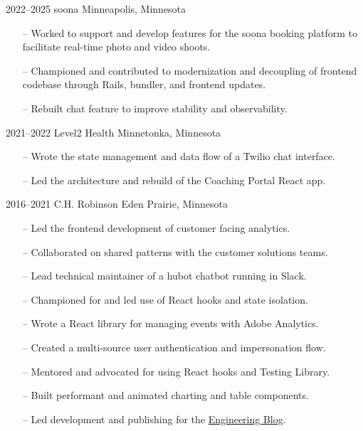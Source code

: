 \documentclass[]{cv-style} %
\begin{document}
\begin{entrylist}


\entry
{2022--2025}
{soona}
{Minneapolis, Minnesota}
{
\begin{itemize}
    \item[--] Worked to support and develop features for the soona booking platform to facilitate real-time photo and video shoots.
    \item[--] Championed and contributed to modernization and decoupling of frontend codebase through Rails, bundler, and frontend updates.
    \item[--] Rebuilt chat feature to improve stability and observability.
\end{itemize}}

\entry
{2021--2022}
{Level2 Health}
{Minnetonka, Minnesota}
{
\begin{itemize}
    \item[--] Wrote the state management and data flow of a Twilio chat interface.
    \item[--] Led the architecture and rebuild of the Coaching Portal React app.
\end{itemize}}

\entry
{2016--2021}
{C.H. Robinson}
{Eden Prairie, Minnesota}
{

\begin{itemize}
    \item[--] Led the frontend development of customer facing analytics.
    \item[--] Collaborated on shared patterns with the customer solutions teams.
    \item[--] Lead technical maintainer of a hubot chatbot running in Slack.
    \item[--] Championed for and led use of React hooks and state isolation.
\end{itemize}

\begin{itemize}
    \item[--] Wrote a React library for managing events with Adobe Analytics.
    \item[--] Created a multi-source user authentication and impersonation flow.
    \item[--] Mentored and advocated for using React hooks and Testing Library.
    \item[--] Built performant and animated charting and table components.
    \item[--] Led development and publishing for the \href{https://engineering.chrobinson.com}{Engineering Blog}.
\end{itemize}

}
\end{entrylist}
\end{document}
